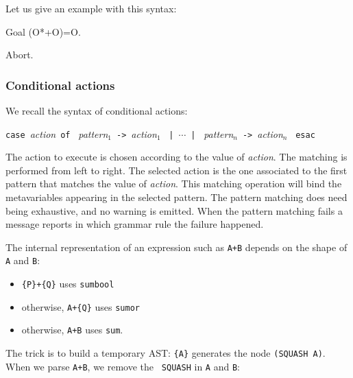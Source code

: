 {Let us give an example with this syntax:

\begin{coq_example}
Goal (O*+O)=O.
\end{coq_example}
\begin{coq_eval}
Abort.
\end{coq_eval}

\subsubsection{Conditional actions}

We recall the syntax of conditional actions:

\begin{center}
\texttt{case}~\textsl{action}~\texttt{of}~%
\textsl{pattern}$_1$~\verb+->+~\textsl{action}$_1$~%
\texttt{|}~$\cdots$~\texttt{|}~%
\textsl{pattern}$_n$~\verb+->+~\textsl{action}$_n$~%
\texttt{esac}
\end{center}

The action to execute is chosen according to the value of
\textsl{action}. The matching is performed from left to right. The
selected action is the one associated to the first pattern that
matches the value of \textsl{action}. This matching operation will
bind the metavariables appearing in the selected pattern. The pattern
matching does need being exhaustive, and no warning is emitted. When the
pattern matching fails a message reports in which grammar rule the
failure happened.


The internal representation of an expression such as {\tt A+B} depends
on the shape of {\tt A} and {\tt B}:
\begin{itemize}
\item \verb/{P}+{Q}/ uses {\tt sumbool}
\item otherwise, \verb/A+{Q}/ uses {\tt sumor}
\item otherwise, \verb/A+B/ uses {\tt sum}.
\end{itemize}
The trick is to build a temporary AST: \verb/{A}/ generates the node
\verb/(SQUASH A)/. When we parse \verb/A+B/, we remove the {\tt
SQUASH} in {\tt A} and {\tt B}:


}
